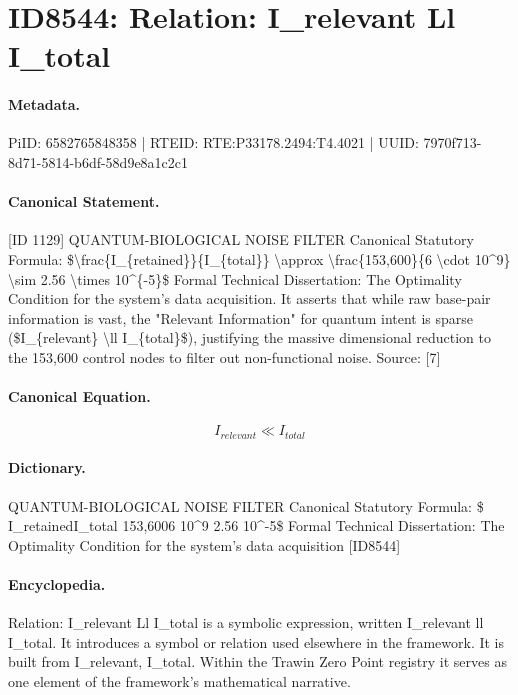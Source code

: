 \section*{ID8544: Relation: I\_relevant Ll I\_total}
\paragraph{Metadata.}
PiID: 6582765848358 | RTEID: RTE:P33178.2494:T4.4021 | UUID: 7970f713-8d71-5814-b6df-58d9e8a1c2c1

\paragraph{Canonical Statement.}
[ID 1129] QUANTUM-BIOLOGICAL NOISE FILTER Canonical Statutory Formula: \$\textbackslash{}frac\{I\_\{retained\}\}\{I\_\{total\}\} \textbackslash{}approx \textbackslash{}frac\{153,600\}\{6 \textbackslash{}cdot 10\textasciicircum{}9\} \textbackslash{}sim 2.56 \textbackslash{}times 10\textasciicircum{}\{-5\}\$ Formal Technical Dissertation: The Optimality Condition for the system's data acquisition. It asserts that while raw base-pair information is vast, the "Relevant Information" for quantum intent is sparse (\$I\_\{relevant\} \textbackslash{}ll I\_\{total\}\$), justifying the massive dimensional reduction to the 153,600 control nodes to filter out non-functional noise. Source: [7]

\paragraph{Canonical Equation.}
\[
I_{relevant} \ll I_{total}
\]

\paragraph{Dictionary.}
QUANTUM-BIOLOGICAL NOISE FILTER Canonical Statutory Formula: \$ I\_retainedI\_total 153,6006 10\textasciicircum{}9 2.56 10\textasciicircum{}-5\$ Formal Technical Dissertation: The Optimality Condition for the system's data acquisition [ID8544]

\paragraph{Encyclopedia.}
Relation: I\_relevant Ll I\_total is a symbolic expression, written I\_relevant ll I\_total. It introduces a symbol or relation used elsewhere in the framework. It is built from I\_relevant, I\_total. Within the Trawin Zero Point registry it serves as one element of the framework's mathematical narrative.
